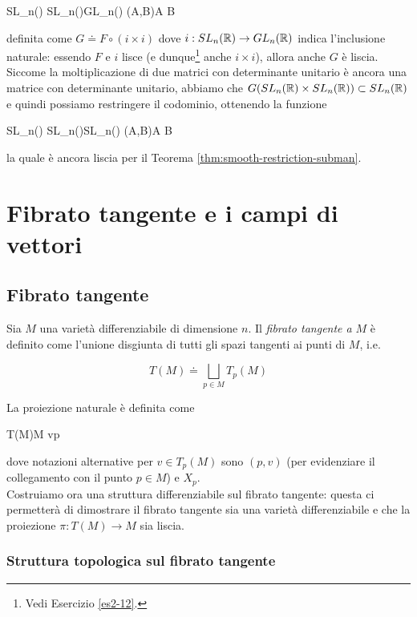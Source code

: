 	{SL_{n}(\R) \times SL_{n}(\R)}{GL_{n}(\R)}
	{(A,B)}{A B}

definita come $ G \doteq F \circ (i \times i) $ dove $ i : SL_{n}(\mathbb{R}) \to GL_{n}(\mathbb{R}) $ indica l'inclusione naturale: essendo $ F $ e $ i $ lisce (e dunque\footnote{%
	Vedi Esercizio \ref{es2-12}.%
} anche $ i \times i $), allora anche $ G $ è liscia.\\
Siccome la moltiplicazione di due matrici con determinante unitario è ancora una matrice con determinante unitario, abbiamo che $ G(SL_{n}(\mathbb{R}) \times SL_{n}(\mathbb{R})) \subset SL_{n}(\mathbb{R}) $ e quindi possiamo restringere il codominio, ottenendo la funzione

\map{\mu}
	{SL_{n}(\R) \times SL_{n}(\R)}{SL_{n}(\R)}
	{(A,B)}{A B}

la quale è ancora liscia per il Teorema \ref{thm:smooth-restriction-subman}.

\section{Fibrato tangente e i campi di vettori}

\subsection{Fibrato tangente}

Sia $ M $ una varietà differenziabile di dimensione $ n $. Il \textit{fibrato tangente a} $ M $ è definito come l'unione disgiunta di tutti gli spazi tangenti ai punti di $ M $, i.e.

\begin{equation}
	T(M) \doteq \bigsqcup_{p \in M} T_{p}(M)
\end{equation}

La proiezione naturale è definita come

\map{\pi}
	{T(M)}{M}
	{v}{p}

dove notazioni alternative per $ v \in T_{p}(M) $ sono $ (p,v) $ (per evidenziare il collegamento con il punto $ p \in M $) e $ X_{p} $.\\
Costruiamo ora una struttura differenziabile sul fibrato tangente: questa ci permetterà di dimostrare il fibrato tangente sia una varietà differenziabile e che la proiezione $ \pi : T(M) \to M $ sia liscia.

\subsubsection{Struttura topologica sul fibrato tangente}

